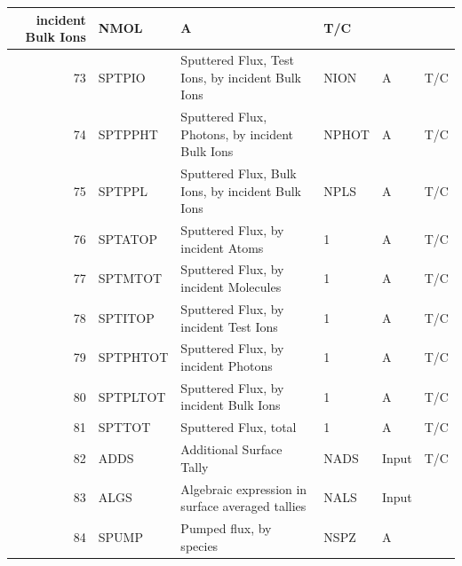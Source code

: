 \begin{landscape}
\begin{longtable}{|r|l|l|l|l|c|}
    incident Bulk Ions & NMOL
                       & \si{\ampere}           & T/C
    \\	\hline
    73                 & SPTPIO                 & Sputtered Flux, Test Ions, by
    incident Bulk Ions & NION
                       & \si{\ampere}           & T/C
    \\	  \hline
    74                 & SPTPPHT                & Sputtered Flux, Photons, by incident
    Bulk Ions          & NPHOT
                       & \si{\ampere}           & T/C
    \\	  \hline
    75                 & SPTPPL                 & Sputtered Flux, Bulk Ions, by
    incident Bulk Ions & NPLS
                       & \si{\ampere}           & T/C
    \\	\hline \hline
    76                 & SPTATOP                & Sputtered Flux, by incident Atoms
                       & 1
                       & \si{\ampere}           & T/C
    \\ \hline
    77                 & SPTMTOT                & Sputtered Flux, by incident
    Molecules          & 1
                       & \si{\ampere}           & T/C
    \\	\hline
    78                 & SPTITOP                & Sputtered Flux, by incident Test
    Ions               & 1
                       & \si{\ampere}           & T/C
    \\	  \hline
    79                 & SPTPHTOT               & Sputtered Flux, by incident Photons
                       & 1
                       & \si{\ampere}           & T/C
    \\	  \hline
    80                 & SPTPLTOT               & Sputtered Flux, by incident Bulk
    Ions               & 1
                       & \si{\ampere}           & T/C
    \\	\hline \hline
    81                 & SPTTOT                 & Sputtered Flux, total
                       & 1
                       & \si{\ampere}           & T/C
    \\	\hline\hline
    82                 & ADDS                   & Additional Surface Tally
                       & NADS
                       & Input                  & T/C
    \\	\hline
    83                 & ALGS                   & Algebraic expression in surface
    averaged tallies   & NALS
                       & Input                  &
    \\	\hline
    84                 & SPUMP                  & Pumped flux, by species
                       & NSPZ
                       & \si{\ampere}           &
    \\	\hline
  \end{longtable}


\end{landscape}
